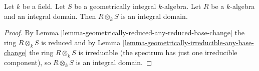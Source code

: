 \begin{lemma}
\label{lemma-geometrically-integral-any-integral-base-change}
Let $k$ be a field. Let $S$ be a geometrically integral $k$-algebra.
Let $R$ be a $k$-algebra and an integral domain. Then $R \otimes_k S$
is an integral domain.
\end{lemma}

\begin{proof}
By Lemma \ref{lemma-geometrically-reduced-any-reduced-base-change}
the ring $R \otimes_k S$ is reduced and by
Lemma \ref{lemma-geometrically-irreducible-any-base-change}
the ring $R \otimes_k S$ is irreducible (the spectrum
has just one irreducible component), so $R \otimes_k S$ is
an integral domain.
\end{proof}